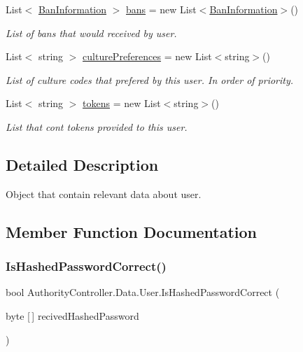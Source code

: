 \begin{DoxyCompactItemize}
List$<$ \mbox{\hyperlink{struct_authority_controller_1_1_data_1_1_ban_information}{Ban\+Information}} $>$ \mbox{\hyperlink{class_authority_controller_1_1_data_1_1_user_a2b446b542b04e20debd43d5107ded674}{bans}} = new List$<$\mbox{\hyperlink{struct_authority_controller_1_1_data_1_1_ban_information}{Ban\+Information}}$>$()
\begin{DoxyCompactList}\small\item\em List of bans that would received by user. \end{DoxyCompactList}\item 
List$<$ string $>$ \mbox{\hyperlink{class_authority_controller_1_1_data_1_1_user_a805641f7b51d9399c07f854ce1893def}{culture\+Preferences}} = new List$<$string$>$()
\begin{DoxyCompactList}\small\item\em List of culture codes that prefered by this user. In order of priority. \end{DoxyCompactList}\item 
List$<$ string $>$ \mbox{\hyperlink{class_authority_controller_1_1_data_1_1_user_a881f9d9beaa89819daf95838bdc5a984}{tokens}} = new List$<$string$>$()
\begin{DoxyCompactList}\small\item\em List that cont tokens provided to this user. \end{DoxyCompactList}\end{DoxyCompactItemize}


\subsection{Detailed Description}
Object that contain relevant data about user. 



\subsection{Member Function Documentation}
\mbox{\label{class_authority_controller_1_1_data_1_1_user_ab34b934bfdb2603010dd4f25f118c3b4}} 
\subsubsection{\texorpdfstring{Is\+Hashed\+Password\+Correct()}{IsHashedPasswordCorrect()}}
{\footnotesize\ttfamily bool Authority\+Controller.\+Data.\+User.\+Is\+Hashed\+Password\+Correct (\begin{DoxyParamCaption}\item[{byte \mbox{[}$\,$\mbox{]}}]{recived\+Hashed\+Password }\end{DoxyParamCaption})}



